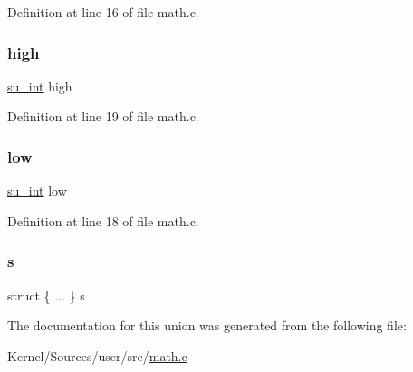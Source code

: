 Definition at line 16 of file math.\+c.

\mbox{\label{unionudwords_ab71d57a34d32cc4a0250444dbe4364b0}} 
\subsubsection{\texorpdfstring{high}{high}}
{\footnotesize\ttfamily \hyperlink{math_8c_ac80f361c8037aadb06208683492f5753}{su\+\_\+int} high}



Definition at line 19 of file math.\+c.

\mbox{\label{unionudwords_aa8808d04ef26a57c2797d761b736379d}} 
\subsubsection{\texorpdfstring{low}{low}}
{\footnotesize\ttfamily \hyperlink{math_8c_ac80f361c8037aadb06208683492f5753}{su\+\_\+int} low}



Definition at line 18 of file math.\+c.

\mbox{\label{unionudwords_a007f8c39ee901bb8633f231faeb6c219}} 
\subsubsection{\texorpdfstring{s}{s}}
{\footnotesize\ttfamily struct \{ ... \}   s}



The documentation for this union was generated from the following file\+:\begin{DoxyCompactItemize}
\item 
Kernel/\+Sources/user/src/\hyperlink{math_8c}{math.\+c}\end{DoxyCompactItemize}
